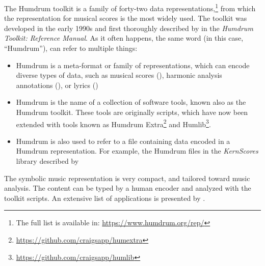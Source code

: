 


The Humdrum toolkit is a family of forty-two data
representations,\footnote{The full list is available in:
\href{https://www.humdrum.org/rep/}{https://www.humdrum.org/rep/}}
from which the  representation for musical
scores is the most widely used. The toolkit was developed in
the early 1990s and first thoroughly described by
\textcite{huron1994humdrum} in the \emph{Humdrum Toolkit:
Reference Manual}. As it often happens, the same word (in
this case, ``Humdrum''), can refer to multiple things:

\begin{itemize}
    \item Humdrum is a meta-format or family of
    representations, which can encode diverse types of data,
    such as musical scores (), harmonic
    analysis annotations (), or lyrics
    ()
    \item Humdrum is the name of a collection of software
    tools, known also as the Humdrum toolkit. These tools
    are originally  scripts, which have now been
    extended with  tools known as Humdrum
    Extra\footnote{\href{https://github.com/craigsapp/humextra}{https://github.com/craigsapp/humextra}}
    and
    Humlib\footnote{\href{https://github.com/craigsapp/humlib}{https://github.com/craigsapp/humlib}}.
    \item Humdrum is also used to refer to a file containing
    data encoded in a Humdrum representation. For example,
    the Humdrum files in the \emph{KernScores} library
    described by~\textcite{sapp2005online}
\end{itemize}


The  symbolic music representation is very
compact, and tailored toward music analysis. The content can
be typed by a human encoder and analyzed with the toolkit
scripts. An extensive list of applications is presented by
\textcite{sapp2011computational}.


